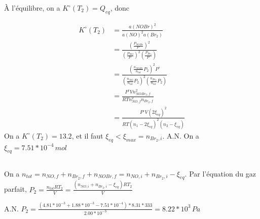 \documentclass[a4paper,12pt]{book}
\begin{document}
À l’équilibre, on a $K^\circ(T_2)=Q_{eq}$, donc 

\begin{align*}
    K^\circ(T_2)       &=\frac{a(NOBr)^2}{a(NO)^2a(Br_2)}\\
                       &=\frac{\left(\frac{P_{NOBr}}{P^\circ}\right)^2}{\left(\frac{P_{NO}}{P^\circ}\right)^2\left(\frac{P_{Br_2}}{P^\circ}\right)}\\
                       &=\frac{\left(\frac{n_{NOBr}}{n_{tot}}P_2\right)^2P^\circ}{\left(\frac{n_{NO}}{n_{tot}}P_2\right)^2\left(\frac{n_{Br_2}}{n_{tot}}P_2\right)}\\
                       &=\frac{P^\circ V n^2_{NOBr_2,f}}{RTn^2_{NO,f}n_{Br_2,f}}\\
                       &=\frac{P^\circ V (2\xi_{eq})^2}{RT(n_1-2\xi_{eq})^2(n_2-\xi_{eq})}
\end{align*}
On a $K^\circ(T_2)=13.2$, et il faut $\xi_{eq}<\xi_{max}=n_{Br_2,i}$. A.N. On a $\boxed{\xi_{eq}=7.51*10^{-4}\,mol}$
\subsection{}
On a $n_{tot}=n_{NO,f}+n_{Br_2,f}+n_{NOBr,f}=n_{NO,i}+n_{Br_2,i}-\xi_{eq}$. 
Par l'équation du gaz parfait, $\boxed{P_2=\frac{n_{tot}RT_2}{V}=\frac{(n_{NO,i}+n_{Br_2,i}-\xi_{eq})RT_2}{V}}$

A.N. $\boxed{P_2=\frac{(4.81*10^{-3}+1.88*10^{-3}-7.51*10^{-4})*8.31*333}{2.00*10^{-3}}=8.22*10^{3}\,Pa}$
\end{document}
